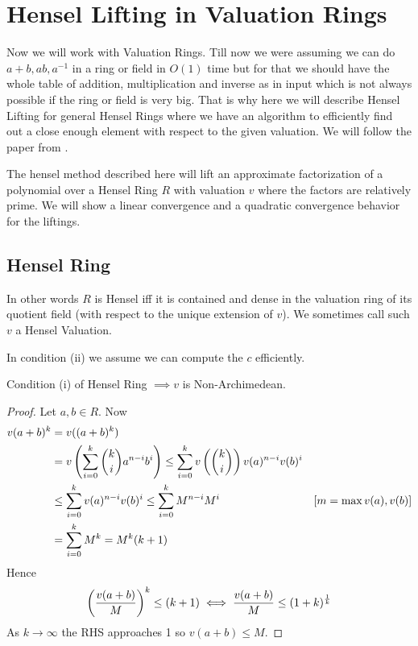 \chapter{Hensel Lifting in Valuation Rings}
Now we will work with Valuation Rings. Till now we were assuming we can do $a+b, ab, a^{-1}$ in a ring or field in $O(1)$ time but for that we should have the whole table of addition, multiplication and inverse as in input which is not always possible if the ring or field is very big. That is why here we will describe Hensel Lifting for general Hensel Rings where we have an algorithm to efficiently find out a close enough element with respect to the given valuation. We will follow the paper from \cite{hensel-newton-valring}.

The hensel method described here will lift an approximate factorization of a polynomial over a Hensel Ring $R$ with valuation $v$ where the factors are relatively prime. We will show a linear convergence and a quadratic convergence behavior for the liftings.
\section{Hensel Ring}
In other words $R$ is Hensel iff it is contained and dense in the valuation ring of its quotient field (with respect to the unique extension of $v$). We sometimes call such $v$ a Hensel Valuation. 

In condition (ii) we assume we can compute the $c$ efficiently.
\begin{Theorem}{}{}
	Condition (i) of Hensel Ring $\implies v$ is Non-Archimedean.
\end{Theorem}
\begin{proof}
	Let $a,b\in R$. Now \begin{align*}
		v(a+b)^k & = v((a+b)^k)\\
		& = v\left(\sum_{i=0}^k{{k}\choose{i}}a^{n-i}b^i  \right)\leq \sum_{i=0}^kv\left(\binom{k}{i}\right)v(a)^{n-i}v(b)^i\\
		&\leq \sum_{i=0}^kv(a)^{n-i}v(b)^i\leq \sum_{i=0}^kM^{n-i}M^i &[m=\max{v(a),v(b)}]\\
		&=\sum_{i=0}^kM^k=M^k(k+1)
	\end{align*}Hence $$\left(\frac{v(a+b)}{M}\right)^k\leq (k+1)\iff \frac{v(a+b)}{M}\leq (1+k)^{\frac1k}$$As $k\to \infty$ the RHS approaches 1 so $v(a+b)\leq M$. 
\end{proof}

